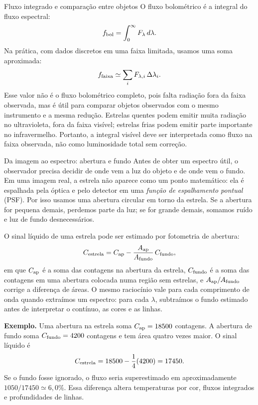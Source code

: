 \documentclass[11pt,a4paper]{article}
\begin{document}
\begin{lessonblock}{Fluxo integrado e comparação entre objetos}
O fluxo bolométrico é a integral do fluxo espectral:
\[
f_{\rm bol}=\int_0^\infty F_\lambda\,d\lambda.
\]
Na prática, com dados discretos em uma faixa limitada, usamos uma soma aproximada:
\[
f_{\rm faixa}\simeq \sum_i F_{\lambda,i}\,\Delta\lambda_i.
\]
Esse valor não é o fluxo bolométrico completo, pois falta radiação fora da faixa observada, mas é útil para comparar objetos observados com o mesmo instrumento e a mesma redução. Estrelas quentes podem emitir muita radiação no ultravioleta, fora da faixa visível; estrelas frias podem emitir parte importante no infravermelho. Portanto, a integral visível deve ser interpretada como fluxo na faixa observada, não como luminosidade total sem correção.
\end{lessonblock}

\begin{lessonblock}{Da imagem ao espectro: abertura e fundo}
Antes de obter um espectro útil, o observador precisa decidir de onde vem a luz do objeto e de onde vem o fundo. Em uma imagem real, a estrela não aparece como um ponto matemático: ela é espalhada pela óptica e pelo detector em uma \textit{função de espalhamento pontual} (PSF). Por isso usamos uma abertura circular em torno da estrela. Se a abertura for pequena demais, perdemos parte da luz; se for grande demais, somamos ruído e luz de fundo desnecessários.

O sinal líquido de uma estrela pode ser estimado por fotometria de abertura:
\[
C_{\rm estrela}=C_{\rm ap}-\frac{A_{\rm ap}}{A_{\rm fundo}}\,C_{\rm fundo},
\]
em que $C_{\rm ap}$ é a soma das contagens na abertura da estrela, $C_{\rm fundo}$ é a soma das contagens em uma abertura colocada numa região sem estrelas, e $A_{\rm ap}/A_{\rm fundo}$ corrige a diferença de áreas. O mesmo raciocínio vale para cada comprimento de onda quando extraímos um espectro: para cada $\lambda$, subtraímos o fundo estimado antes de interpretar o contínuo, as cores e as linhas.

\textbf{Exemplo.} Uma abertura na estrela soma $C_{\rm ap}=18500$ contagens. A abertura de fundo soma $C_{\rm fundo}=4200$ contagens e tem área quatro vezes maior. O sinal líquido é
\[
C_{\rm estrela}=18500-\frac{1}{4}(4200)=17450.
\]
Se o fundo fosse ignorado, o fluxo seria superestimado em aproximadamente $1050/17450\simeq 6{,}0\%$. Essa diferença altera temperaturas por cor, fluxos integrados e profundidades de linhas.
\end{lessonblock}
\end{document}
